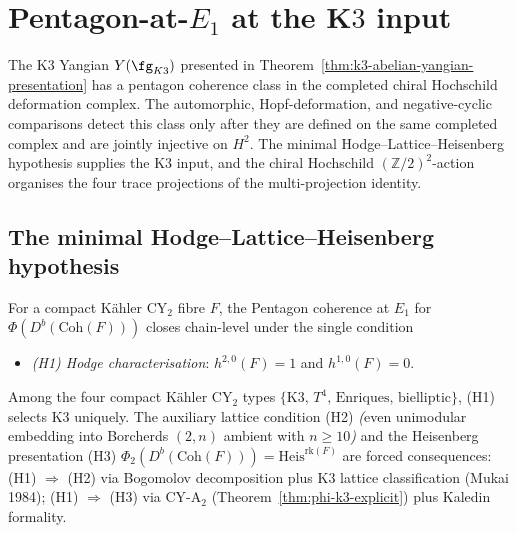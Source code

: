 
\section{Pentagon-at-\texorpdfstring{$E_1$}{E-1} at the K\texorpdfstring{$3$}{3} input}
\label{sec:k3-pentagon-E1-edge-architecture}

The K$3$ Yangian $Y(\fg_{K3})$ presented in
Theorem~\ref{thm:k3-abelian-yangian-presentation} has a pentagon
coherence class in the completed chiral Hochschild deformation complex.
The automorphic, Hopf-deformation, and negative-cyclic comparisons
detect this class only after they are defined on the same completed
complex and are jointly injective on \(H^2\). The minimal
Hodge--Lattice--Heisenberg hypothesis supplies the K3 input, and the
chiral Hochschild $(\mathbb{Z}/2)^2$-action organises the four trace
projections of the multi-projection identity.

\subsection{The minimal Hodge--Lattice--Heisenberg hypothesis}
\label{subsec:k3-mhlh-hypothesis}

\begin{proposition}
\label{prop:mhlh-geometric}
For a compact K\"ahler CY$_2$ fibre $F$, the Pentagon coherence at
$E_1$ for $\Phi(D^b(\mathrm{Coh}(F)))$ closes chain-level under the
single condition
\begin{itemize}
\item \emph{(H1) Hodge characterisation}: $h^{2,0}(F) = 1$ and
 $h^{1,0}(F) = 0$.
\end{itemize}
Among the four compact K\"ahler CY$_2$ types
$\{\mathrm{K3},\, T^4,\, \mathrm{Enriques},\, \mathrm{bielliptic}\}$,
\textup{(H1)} selects K$3$ uniquely. The auxiliary
lattice condition \textup{(H2)} \emph{(}even unimodular embedding into
Borcherds $(2,n)$ ambient with $n \geq 10$\emph{)} and the Heisenberg
presentation \textup{(H3)} $\Phi_2(D^b(\mathrm{Coh}(F))) =
\mathrm{Heis}^{\mathrm{rk}(F)}$ are forced consequences:
\textup{(H1)} $\Rightarrow$ \textup{(H2)} via Bogomolov decomposition
plus K$3$ lattice classification \textup{(}Mukai 1984\textup{);}
\textup{(H1)} $\Rightarrow$ \textup{(H3)} via CY-A$_2$
\textup{(}Theorem~\ref{thm:phi-k3-explicit}\textup{)} plus Kaledin
formality.
\end{proposition}

